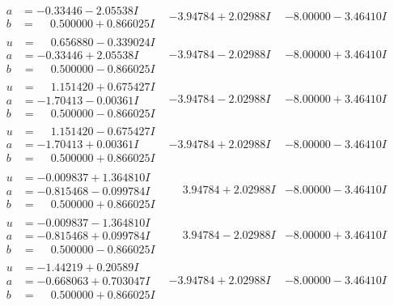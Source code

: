 \documentclass[1p]{elsarticle_modified}
\theoremstyle{definition}
\begin{document}
$$\begin{array}{c|c|c}
\begin{aligned}
a &= -0.33446 - 2.05538 I \\
b &= \phantom{-}0.500000 + 0.866025 I\end{aligned}
 & -3.94784 + 2.02988 I & -8.00000 - 3.46410 I \\ \hline\begin{aligned}
u &= \phantom{-}0.656880 - 0.339024 I \\
a &= -0.33446 + 2.05538 I \\
b &= \phantom{-}0.500000 - 0.866025 I\end{aligned}
 & -3.94784 - 2.02988 I & -8.00000 + 3.46410 I \\ \hline\begin{aligned}
u &= \phantom{-}1.151420 + 0.675427 I \\
a &= -1.70413 - 0.00361 I \\
b &= \phantom{-}0.500000 - 0.866025 I\end{aligned}
 & -3.94784 - 2.02988 I & -8.00000 + 3.46410 I \\ \hline\begin{aligned}
u &= \phantom{-}1.151420 - 0.675427 I \\
a &= -1.70413 + 0.00361 I \\
b &= \phantom{-}0.500000 + 0.866025 I\end{aligned}
 & -3.94784 + 2.02988 I & -8.00000 - 3.46410 I \\ \hline\begin{aligned}
u &= -0.009837 + 1.364810 I \\
a &= -0.815468 - 0.099784 I \\
b &= \phantom{-}0.500000 + 0.866025 I\end{aligned}
 & \phantom{-}3.94784 + 2.02988 I & -8.00000 - 3.46410 I \\ \hline\begin{aligned}
u &= -0.009837 - 1.364810 I \\
a &= -0.815468 + 0.099784 I \\
b &= \phantom{-}0.500000 - 0.866025 I\end{aligned}
 & \phantom{-}3.94784 - 2.02988 I & -8.00000 + 3.46410 I \\ \hline\begin{aligned}
u &= -1.44219 + 0.20589 I \\
a &= -0.668063 + 0.703047 I \\
b &= \phantom{-}0.500000 + 0.866025 I\end{aligned}
 & -3.94784 + 2.02988 I & -8.00000 - 3.46410 I \\ \hline\begin{aligned}

\end{aligned}
\end{array}$$
\end{document}
